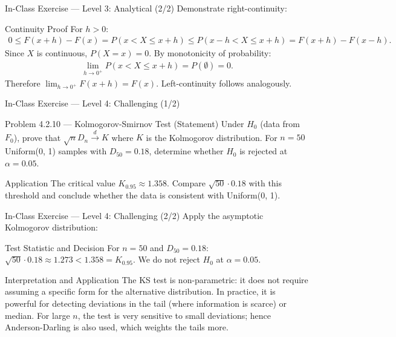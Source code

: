 \documentclass[aspectratio=169,xcolor={dvipsnames,table}]{beamer}
\begin{document}
\begin{frame}{In-Class Exercise --- Level 3: Analytical (2/2)}
	\vspace{-0.05cm}
	\scriptsize
	Demonstrate right-continuity: \pause
	\begin{block}{Continuity Proof}
		\scriptsize
		For $h > 0$:
		\begin{align*}
			0 \le F(x + h) - F(x) = P(x < X \le x + h) \le P(x - h < X \le x + h) = F(x+h) - F(x-h).
		\end{align*}
		Since $X$ is continuous, $P(X = x) = 0$. By monotonicity of probability:
		\begin{align*}
			\lim_{h \to 0^{+}} P(x < X \le x + h) = P(\emptyset) = 0.
		\end{align*}
		Therefore $\lim_{h \to 0^{+}} F(x + h) = F(x)$. Left-continuity follows analogously. \quad \qedhere
	\end{block}
\end{frame}

\begin{frame}{In-Class Exercise --- Level 4: Challenging (1/2)}
	\vspace{-0.1cm}
	\begin{block}{Problem 4.2.10 --- Kolmogorov-Smirnov Test (Statement)}
		Under $H_{0}$ (data from $F_{0}$), prove that $\sqrt{n} D_{n} \xrightarrow{d} K$ where $K$ is the Kolmogorov distribution. For $n = 50$ Uniform(0, 1) samples with $D_{50} = 0.18$, determine whether $H_{0}$ is rejected at $\alpha = 0.05$.
	\end{block}
	\vspace{0.15cm}
	\pause
	\begin{alertblock}{Application}
		\scriptsize
		The critical value $K_{0.95} \approx 1.358$. Compare $\sqrt{50} \cdot 0.18$ with this threshold and conclude whether the data is consistent with Uniform(0, 1).
	\end{alertblock}
\end{frame}

\begin{frame}{In-Class Exercise --- Level 4: Challenging (2/2)}
	\vspace{-0.05cm}
	\scriptsize
	Apply the asymptotic Kolmogorov distribution: \pause
	\begin{block}{Test Statistic and Decision}
		\scriptsize
		For $n = 50$ and $D_{50} = 0.18$: $\sqrt{50} \cdot 0.18 \approx 1.273 < 1.358 = K_{0.95}$. We do not reject $H_{0}$ at $\alpha = 0.05$. \quad \qedhere
	\end{block}
	\vspace{0.05cm}
	\pause
	\begin{alertblock}{Interpretation and Application}
		\scriptsize
		The KS test is non-parametric: it does not require assuming a specific form for the alternative distribution. In practice, it is powerful for detecting deviations in the tail (where information is scarce) or median. For large $n$, the test is very sensitive to small deviations; hence Anderson-Darling is also used, which weights the tails more.
	\end{alertblock}
\end{frame}
\end{document}
